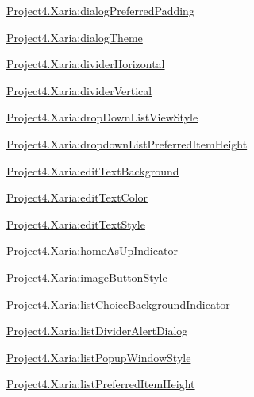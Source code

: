 {\ttfamily \hyperlink{classproject4_1_1xaria_1_1R_1_1styleable_a23b0ff0c142da87ba4d26058c02051dd}{Project4.\+Xaria\+:dialog\+Preferred\+Padding}}

{\ttfamily \hyperlink{classproject4_1_1xaria_1_1R_1_1styleable_a5519afdb0c80e54310abbe3db266a072}{Project4.\+Xaria\+:dialog\+Theme}}

{\ttfamily \hyperlink{classproject4_1_1xaria_1_1R_1_1styleable_ade51be41034a192ff35bec03ba87a1aa}{Project4.\+Xaria\+:divider\+Horizontal}}

{\ttfamily \hyperlink{classproject4_1_1xaria_1_1R_1_1styleable_a2fa98253e4b6f3756570cd37fb944000}{Project4.\+Xaria\+:divider\+Vertical}}

{\ttfamily \hyperlink{classproject4_1_1xaria_1_1R_1_1styleable_ac0bd97fcf21ebf1428f0681d50718950}{Project4.\+Xaria\+:drop\+Down\+List\+View\+Style}}

{\ttfamily \hyperlink{classproject4_1_1xaria_1_1R_1_1styleable_a6564d560cb7e73a0123ed899c3b6ad2e}{Project4.\+Xaria\+:dropdown\+List\+Preferred\+Item\+Height}}

{\ttfamily \hyperlink{classproject4_1_1xaria_1_1R_1_1styleable_a197825ebee98f93494e82626ee54087e}{Project4.\+Xaria\+:edit\+Text\+Background}}

{\ttfamily \hyperlink{classproject4_1_1xaria_1_1R_1_1styleable_a8fff9c294080610c2f55e32050dda6d5}{Project4.\+Xaria\+:edit\+Text\+Color}}

{\ttfamily \hyperlink{classproject4_1_1xaria_1_1R_1_1styleable_a9d7977c472c0684d034633f96e9590ef}{Project4.\+Xaria\+:edit\+Text\+Style}}

{\ttfamily \hyperlink{classproject4_1_1xaria_1_1R_1_1styleable_a9ff6722d4ca5847217d1afa321456b6e}{Project4.\+Xaria\+:home\+As\+Up\+Indicator}}

{\ttfamily \hyperlink{classproject4_1_1xaria_1_1R_1_1styleable_a58cb61a783e430c03d51ecf0f3a7b145}{Project4.\+Xaria\+:image\+Button\+Style}}

{\ttfamily \hyperlink{classproject4_1_1xaria_1_1R_1_1styleable_a3c9ed2db305731d7023349657b57ffe2}{Project4.\+Xaria\+:list\+Choice\+Background\+Indicator}}

{\ttfamily \hyperlink{classproject4_1_1xaria_1_1R_1_1styleable_a736eb873329f632a3c8ce494223c9a1b}{Project4.\+Xaria\+:list\+Divider\+Alert\+Dialog}}

{\ttfamily \hyperlink{classproject4_1_1xaria_1_1R_1_1styleable_a7a98332996662c01b4f98ddc8776aa86}{Project4.\+Xaria\+:list\+Popup\+Window\+Style}}

{\ttfamily \hyperlink{classproject4_1_1xaria_1_1R_1_1styleable_a6f1d16f32d0ee16e2782714f155092ff}{Project4.\+Xaria\+:list\+Preferred\+Item\+Height}}

